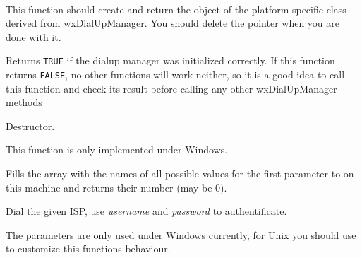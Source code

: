 
\\


\label{wxdialupmanagercreate}


This function should create and return the object of the platform-specific
class derived from wxDialUpManager. You should delete the pointer when you are
done with it.

\label{wxdialupmanagerisok}


Returns {\tt TRUE} if the dialup manager was initialized correctly. If this
function returns {\tt FALSE}, no other functions will work neither, so it is a
good idea to call this function and check its result before calling any other
wxDialUpManager methods

\label{wxdialupmanagerdtor}


Destructor.

\label{wxdialupmanagergetispnames}


This function is only implemented under Windows.

Fills the array with the names of all possible values for the first
parameter to  on this machine and returns
their number (may be $0$).

\label{wxdialupmanagerdial}


Dial the given ISP, use {\it username} and {\it password} to authentificate.

The parameters are only used under Windows currently, for Unix you should use 
 to customize this
functions behaviour.

